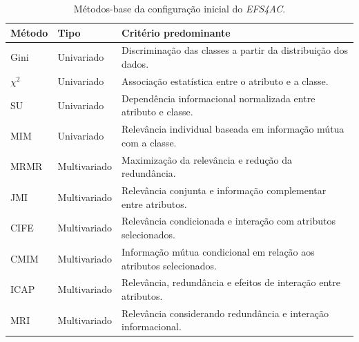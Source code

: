 \begin{table}[ht]
    \centering
    \small
    \caption{Métodos-base da configuração inicial do \textit{EFS4AC}.}
    \label{tab:metodos-base-ac-efs}

    \begin{tabular}{p{2.0cm} p{3.0cm} p{7.2cm}}
        \hline
        \textbf{Método} &
        \textbf{Tipo} &
        \textbf{Critério predominante} \\
        \hline

        Gini
        & Univariado
        & Discriminação das classes a partir da distribuição dos dados. \\

        $\chi^2$
        & Univariado
        & Associação estatística entre o atributo e a classe. \\

        SU
        & Univariado
        & Dependência informacional normalizada entre atributo e classe. \\

        MIM
        & Univariado
        & Relevância individual baseada em informação mútua com a classe. \\

        \hline

        MRMR
        & Multivariado
        & Maximização da relevância e redução da redundância. \\

        JMI
        & Multivariado
        & Relevância conjunta e informação complementar entre atributos. \\

        CIFE
        & Multivariado
        & Relevância condicionada e interação com atributos selecionados. \\

        CMIM
        & Multivariado
        & Informação mútua condicional em relação aos atributos selecionados. \\

        ICAP
        & Multivariado
        & Relevância, redundância e efeitos de interação entre atributos. \\

        MRI
        & Multivariado
        & Relevância considerando redundância e interação informacional. \\

        \hline
    \end{tabular}
\end{table}

